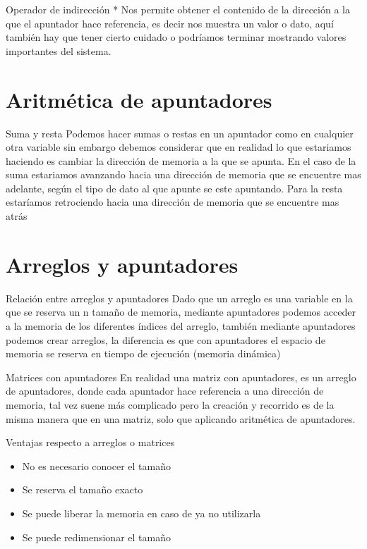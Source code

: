 \documentclass{beamer}
\begin{document}
\begin{frame}{Operador de indirecci\'on *}
	Nos permite obtener el contenido de la direcci\'on a la que el apuntador hace referencia, es decir nos muestra un valor o dato, aqu\'i tambi\'en hay que tener cierto cuidado o podr\'iamos terminar mostrando valores importantes del sistema.
\end{frame}

\section{Aritm\'etica de apuntadores}

\begin{frame}{Suma y resta}
	Podemos hacer sumas o restas en un apuntador como en cualquier otra variable sin embargo debemos considerar que en realidad lo que estariamos haciendo es cambiar la direcci\'on de memoria a la que se apunta.
	En el caso de la suma estariamos avanzando hacia una direcci\'on de memoria que se encuentre mas adelante, seg\'un el tipo de dato al que apunte se este apuntando.
	Para la resta estar\'iamos retrociendo hacia una direcci\'on de memoria que se encuentre mas atr\'as
\end{frame}

\section{Arreglos y apuntadores}

\begin{frame}{Relaci\'on entre arreglos y apuntadores}
	Dado que un arreglo es una variable en la que se reserva un n tamaño de memoria, mediante apuntadores podemos acceder a la memoria de los diferentes \'indices del arreglo, tambi\'en mediante apuntadores podemos crear arreglos, la diferencia es que con apuntadores el espacio de memoria se reserva en tiempo de ejecuci\'on (memoria din\'amica)
\end{frame}

\begin{frame}{Matrices con apuntadores}
	En realidad una matriz con apuntadores, es un arreglo de apuntadores, donde cada apuntador hace referencia a una direcci\'on de memoria, tal vez suene m\'as complicado pero la creaci\'on y recorrido es de la misma manera que en una matriz, solo que aplicando aritm\'etica de apuntadores.
\end{frame}

\begin{frame}{Ventajas respecto a arreglos o matrices}
	\begin{itemize}
		\item No es necesario conocer el tamaño
		\item Se reserva el tamaño exacto
		\item Se puede liberar la memoria en caso de ya no utilizarla
		\item Se puede redimensionar el tamaño
	\end{itemize}
\end{frame}
\end{document}
